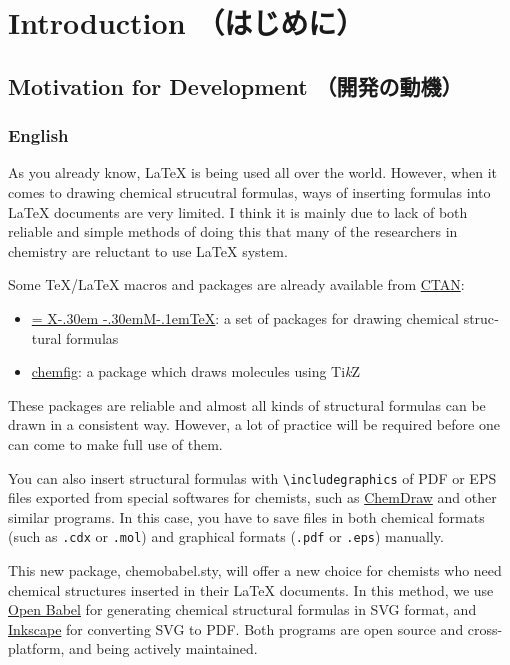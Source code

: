 \documentclass[12pt]{jsarticle}
\def\XyM{\ifnum\fam=-1\relax\fam=0\relax\fi\TestCount=\fam%
X\kern-.30em\smash{\raise.50ex\hbox{$\fam\TestCount\Upsilon$}}%
\kern-.30em{M}}
\def\XyMTeX{\XyM\kern-.1em\TeX}
\begin{document}
\clearpage
\setcounter{tocdepth}{3}
\tableofcontents

\clearpage
{}

\section{Introduction （はじめに）}

\subsection{Motivation for Development （開発の動機）}

\subsubsection{English}

As you already know, {\LaTeX} is being used all over the world.
However, when it comes to drawing chemical strucutral formulas, ways of inserting formulas into {\LaTeX} documents are very limited.
I think it is mainly due to lack of both reliable and simple methods of doing this that many of the researchers in chemistry are reluctant to use {\LaTeX} system.

Some {\TeX}/{\LaTeX} macros and packages are already available from \href{http://www.ctan.org/}{CTAN}:
\begin{itemize}
\item \href{http://www.ctan.org/pkg/xymtex}{\XyMTeX}: a set of pack­ages for draw­ing chem­i­cal struc­tural for­mu­las
\item \href{http://www.ctan.org/pkg/chemfig}{\textsf{chemfig}}: a package which draws molecules us­ing Ti\textit{k}Z
\end{itemize}
These packages are reliable and almost all kinds of structural formulas can be drawn in a consistent way.
However, a lot of practice will be required before one can come to make full use of them.

You can also insert structural formulas with \verb|\includegraphics| of PDF or EPS files exported from special softwares for chemists, such as \href{http://www.cambridgesoft.com/Ensemble_for_Chemistry/ChemDraw/}{ChemDraw} and other similar programs.
In this case, you have to save files in both chemical formats (such as \verb|.cdx| or \verb|.mol|) and graphical formats (\verb|.pdf| or \verb|.eps|) manually.

This new package, \textsf{chemobabel.sty}, will offer a new choice for chemists who need chemical structures inserted in their {\LaTeX} documents.
In this method, we use \href{http://openbabel.org/}{Open Babel} for generating chemical structural formulas in SVG format, and \href{https://inkscape.org/en/}{Inkscape} for converting SVG to PDF.
Both programs are open source and cross-platform, and being actively maintained. \\
\end{document}
